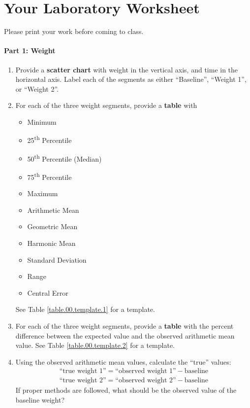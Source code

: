 \section{Your Laboratory Worksheet}
%
Please print your work before coming to class.
%
\paragraph{Part 1: Weight}
%
\begin{enumerate}
    \item Provide a \textbf{scatter chart} with weight in the vertical axis, and time in the horizontal axis. Label each of the segments as either ``Baseline'', ``Weight 1'', or ``Weight 2''.
    \item For each of the three weight segments, provide a \textbf{table} with
    \begin{itemize}
        \item Minimum
        \item 25\textsuperscript{th} Percentile
        \item 50\textsuperscript{th} Percentile (Median)
        \item 75\textsuperscript{th} Percentile
        \item Maximum
        \item Arithmetic Mean
        \item Geometric Mean
        \item Harmonic Mean
        \item Standard Deviation
        \item Range
        \item Central Error
    \end{itemize}
    See Table \ref{table.00.template.1} for a template.
    \item For each of the three weight segments, provide a \textbf{table} with the percent difference between the expected value and the observed arithmetic mean value. See Table \ref{table.00.template.2} for a template.
    \item Using the observed arithmetic mean values, calculate the ``true'' values:
    \begin{gather}
        \text{``true weight 1''} = \text{``observed weight 1''} - \text{baseline} \\
        \text{``true weight 2''} = \text{``observed weight 2''} - \text{baseline}
    \end{gather}
    If proper methods are followed, what should be the observed value of the baseline weight?
\end{enumerate}
%
